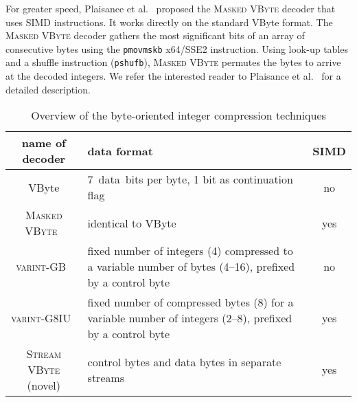 \documentclass[compress]{elsarticle}
\newcommand{\vbyte}{VByte}
\newcommand{\maskedvbyte}{\textsc{Masked \vbyte{}}}
\newcommand{\varintgb}{\textsc{varint-GB}}
\newcommand{\streamvbyte}{\textsc{Stream \vbyte{}}}
\newcommand{\varintgiu}{\textsc{varint-G8IU}}
\begin{document}
For greater speed,
Plaisance et al.~\cite{plaisance2015} proposed the \maskedvbyte{} decoder that uses SIMD instructions. It works directly on
the standard \vbyte{} format.
 The \maskedvbyte{} decoder gathers the most significant bits  of an array of consecutive bytes using the \texttt{pmovmskb} x64/SSE2 instruction. Using look-up tables and a shuffle instruction (\texttt{pshufb}),  \maskedvbyte{} permutes the bytes  to arrive at the decoded integers. We refer the interested reader to
Plaisance et al.~\cite{plaisance2015} for a detailed description.





\begin{table}[b]
\caption{Overview of the byte-oriented integer compression techniques\label{sec:overview}}
\small
\begin{tabular}{cp{6.9cm}c}
\toprule
name of decoder & data format   & SIMD \\
        \midrule
 \vbyte{}       & 7~data~bits per byte, 1 bit as continuation flag      &  no \\
\maskedvbyte{}~\cite{plaisance2015}  & identical to \vbyte{} &  yes \\
\varintgb{}~\cite{DeanOfficialplusslides:2009:CBL:1498759.1498761}  &
fixed number of integers (4) compressed to a variable number of bytes (4--16), prefixed by a control byte  &  no \\
\varintgiu{}~\cite{Stepanov:2011:SDP:2063576.2063627}  &
fixed number of compressed bytes (8) for a variable number of integers (2--8), prefixed by a control byte      &  yes \\
\streamvbyte{} (novel) &  control bytes and data bytes in separate streams &  yes \\\bottomrule
\end{tabular}
\end{table}
\end{document}
